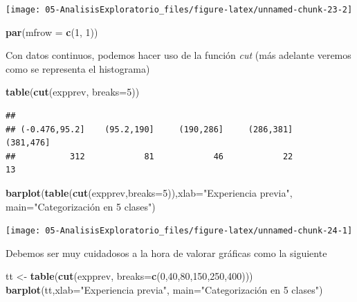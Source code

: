 \documentclass[]{book}
\newenvironment{Shaded}{\begin{snugshade}}{\end{snugshade}}
\newcommand{\DataTypeTok}[1]{\textcolor[rgb]{0.13,0.29,0.53}{#1}}
\newcommand{\DecValTok}[1]{\textcolor[rgb]{0.00,0.00,0.81}{#1}}
\newcommand{\KeywordTok}[1]{\textcolor[rgb]{0.13,0.29,0.53}{\textbf{#1}}}
\newcommand{\NormalTok}[1]{#1}
\newcommand{\StringTok}[1]{\textcolor[rgb]{0.31,0.60,0.02}{#1}}
\begin{document}
\begin{center}\texttt{[image: 05-AnalisisExploratorio\_files/figure-latex/unnamed-chunk-23-2]} \end{center}

\begin{Shaded}
\begin{Highlighting}[]
\KeywordTok{par}\NormalTok{(}\DataTypeTok{mfrow =} \KeywordTok{c}\NormalTok{(}\DecValTok{1}\NormalTok{, }\DecValTok{1}\NormalTok{))}
\end{Highlighting}
\end{Shaded}

Con datos continuos, podemos hacer uso de la función \emph{cut}
(más adelante veremos como se representa el histograma)

\begin{Shaded}
\begin{Highlighting}[]
\KeywordTok{table}\NormalTok{(}\KeywordTok{cut}\NormalTok{(expprev, }\DataTypeTok{breaks=}\DecValTok{5}\NormalTok{))}
\end{Highlighting}
\end{Shaded}

\begin{verbatim}
## 
## (-0.476,95.2]    (95.2,190]     (190,286]     (286,381]     (381,476] 
##           312            81            46            22            13
\end{verbatim}

\begin{Shaded}
\begin{Highlighting}[]
\KeywordTok{barplot}\NormalTok{(}\KeywordTok{table}\NormalTok{(}\KeywordTok{cut}\NormalTok{(expprev,}\DataTypeTok{breaks=}\DecValTok{5}\NormalTok{)),}\DataTypeTok{xlab=}\StringTok{"Experiencia previa"}\NormalTok{,}
        \DataTypeTok{main=}\StringTok{"Categorización en 5 clases"}\NormalTok{)}
\end{Highlighting}
\end{Shaded}

\begin{center}\texttt{[image: 05-AnalisisExploratorio\_files/figure-latex/unnamed-chunk-24-1]} \end{center}

Debemos ser muy cuidadosos a la hora de valorar gráficas como la siguiente

\begin{Shaded}
\begin{Highlighting}[]
\NormalTok{tt <-}\StringTok{ }\KeywordTok{table}\NormalTok{(}\KeywordTok{cut}\NormalTok{(expprev, }\DataTypeTok{breaks=}\KeywordTok{c}\NormalTok{(}\DecValTok{0}\NormalTok{,}\DecValTok{40}\NormalTok{,}\DecValTok{80}\NormalTok{,}\DecValTok{150}\NormalTok{,}\DecValTok{250}\NormalTok{,}\DecValTok{400}\NormalTok{)))}
\KeywordTok{barplot}\NormalTok{(tt,}\DataTypeTok{xlab=}\StringTok{"Experiencia previa"}\NormalTok{, }\DataTypeTok{main=}\StringTok{"Categorización en 5 clases"}\NormalTok{)}
\end{Highlighting}
\end{Shaded}
\end{document}

